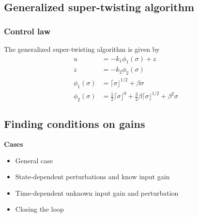 \subsection{Generalized super-twisting algorithm}
\subsubsection{Control law}
The generalized super-twisting algorithm \cite{Cas:18} is given by
\begin{equation}
    \begin{split}
        u &= -k_1 \phi_1(\sigma) + z \\ 
        \dot{z} &= -k_2\phi_2(\sigma) \\
        \phi_1(\sigma) &= \lceil \sigma \rfloor^{1/2} + \beta \sigma \\
        \phi_2(\sigma) &= \frac{1}{2} \lceil \sigma \rfloor^0 + \frac{3}{2}\beta\lceil \sigma \rfloor^{1/2} + \beta^2\sigma  
    \end{split}
\end{equation}

\subsection{Finding conditions on gains}
\textbf{Cases}
\begin{itemize}
\item General case
\item State-dependent perturbations and know input gain
\item Time-dependent unknown input gain and perturbation
\item Closing the loop
\end{itemize}

